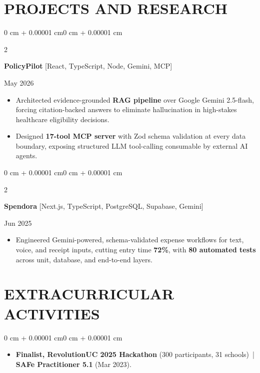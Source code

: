 \documentclass[10pt, letterpaper]{article}
\newenvironment{highlights}{
    \begin{itemize}[
        topsep=0.10 cm,
        parsep=0.06 cm,
        partopsep=0pt,
        itemsep=0.06 cm,
        leftmargin=12pt
    ]
}{
    \end{itemize}
}
\newenvironment{onecolentry}{
    \begin{adjustwidth}{0 cm + 0.00001 cm}{0 cm + 0.00001 cm}
}{
    \end{adjustwidth}
}
\newenvironment{twocolentry}[2][]{
    \onecolentry
    \def\secondColumn{#2}
    \setcolumnwidth{\fill, 4.5 cm}
    \begin{paracol}{2}
}{
    \switchcolumn \raggedleft \secondColumn
    \end{paracol}
    \endonecolentry
}
\begin{document}
\section{PROJECTS AND RESEARCH}
\begin{twocolentry}{May 2026}
\textbf{PolicyPilot} [React, TypeScript, Node, Gemini, MCP]
\end{twocolentry}
\begin{highlights}
  \item Architected evidence-grounded \textbf{RAG pipeline} over Google Gemini 2.5-flash, forcing citation-backed answers to eliminate hallucination in high-stakes healthcare eligibility decisions.
  \item Designed \textbf{17-tool MCP server} with Zod schema validation at every data boundary, exposing structured LLM tool-calling consumable by external AI agents.
\end{highlights}

\vspace{0.12 cm}

\begin{twocolentry}{Jun 2025}
\textbf{Spendora} [Next.js, TypeScript, PostgreSQL, Supabase, Gemini]
\end{twocolentry}
\begin{highlights}
  \item Engineered Gemini-powered, schema-validated expense workflows for text, voice, and receipt inputs, cutting entry time \textbf{72\%}, with \textbf{80 automated tests} across unit, database, and end-to-end layers.
\end{highlights}

\section{EXTRACURRICULAR ACTIVITIES}
\begin{onecolentry}
\begin{highlights}
  \item \textbf{Finalist, RevolutionUC 2025 Hackathon} (300 participants, 31 schools) \,|\, \textbf{SAFe Practitioner 5.1} (Mar 2023).
\end{highlights}
\end{onecolentry}
\end{document}
